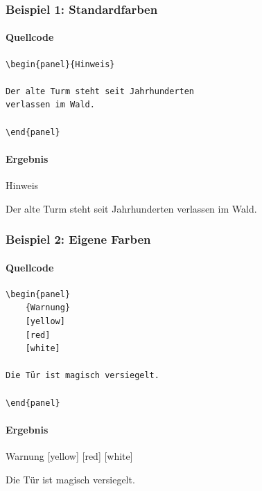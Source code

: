 \subsubsection*{Beispiel 1: Standardfarben}

\paragraph{Quellcode}

\begin{Verbatim}
\begin{panel}{Hinweis}

Der alte Turm steht seit Jahrhunderten
verlassen im Wald.

\end{panel}
\end{Verbatim}

\paragraph{Ergebnis}

\begin{panel}{Hinweis}

Der alte Turm steht seit Jahrhunderten
verlassen im Wald.

\end{panel}

\subsubsection*{Beispiel 2: Eigene Farben}

\paragraph{Quellcode}

\begin{Verbatim}
\begin{panel}
    {Warnung}
    [yellow]
    [red]
    [white]

Die Tür ist magisch versiegelt.

\end{panel}
\end{Verbatim}

\paragraph{Ergebnis}

\begin{panel}
    {Warnung}
    [yellow]
    [red]
    [white]

Die Tür ist magisch versiegelt.

\end{panel}
